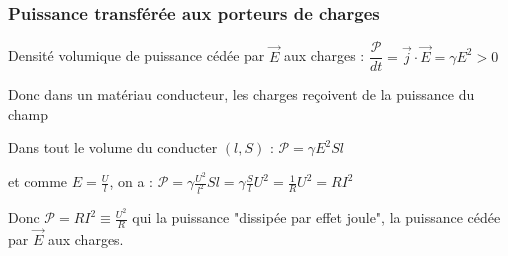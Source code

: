 \documentclass[a4paper,12pt]{book}
\begin{document}
\subsubsection{Puissance transférée aux porteurs de charges}
Densité volumique de puissance cédée par $\vec{E}$ aux charges : $\dfrac{\mathcal{P}}{dt} = \vec{j}\cdot\vec{E} = \gamma E^2>0$ \par Donc dans un matériau conducteur, les charges reçoivent de la puissance du champ
\par Dans tout le volume du conducter $(l,S)$ : $\mathcal{P}=\gamma E^2 Sl$ \par et comme $E=\frac{U}{l}$, on a : $\mathcal{P}=\gamma\frac{U^2}{l^2}Sl = \gamma\frac{S}{l}U^2 = \frac{1}{R}U^2 = RI^2$
\par Donc $\mathcal{P} = RI^2\equiv \frac{U^2}{R}$ qui la puissance "dissipée par effet joule", la puissance cédée par $\vec{E}$ aux charges.
\end{document}
